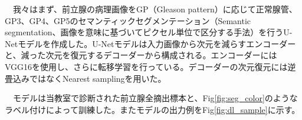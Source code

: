 　我々はまず、前立腺の病理画像をGP（Gleason pattern）に応じて正常腺管、GP3、GP4、GP5のセマンティックセグメンテーション（Semantic segmentation、画像を意味に基づいてピクセル単位で区分する手法）を行うU-Net\cite{unet}モデルを作成した。U-Netモデルは入力画像から次元を減らすエンコーダーと、減った次元を復元するデコーダーから構成される。エンコーダーにはVGG16\cite{vgg}を使用し、さらに転移学習を行っている。デコーダーの次元復元には逆畳込みではなくNearest samplingを用いた。\par

\vspace{0.5zh}

　モデルは当教室で診断された前立腺全摘出標本と、Fig\ref{fig:seg_color}のようなラベル付けによって訓練した。またモデルの出力例をFig\ref{fig:dl_sample}に示す。\par

